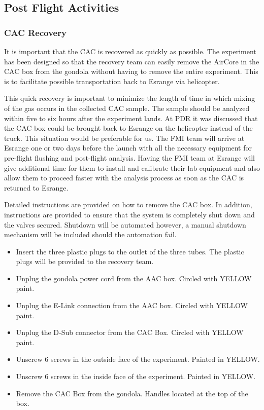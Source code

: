 \subsection{Post Flight Activities}

\subsubsection{CAC Recovery}
It is important that the CAC is recovered as quickly as possible. The experiment has been designed so that the recovery team can easily remove the AirCore in the CAC box from the gondola without having to remove the entire experiment. This is to facilitate possible transportation back to Esrange via helicopter.

This quick recovery is important to minimize the length of time in which mixing of the gas occurs in the collected CAC sample. The sample should be analyzed within five to six hours after the experiment lands. At PDR it was discussed that the CAC box could be brought back to Esrange on the helicopter instead of the truck. This situation would be preferable for us. 
The FMI team will arrive at Esrange one or two days before the launch with all the necessary equipment for pre-flight flushing and post-flight analysis. Having the FMI team at Esrange will give additional time for them to install and calibrate their lab equipment and also allow them to proceed faster with the analysis process as soon as the CAC is returned to Esrange. 

Detailed instructions are provided on how to remove the CAC box. In addition, instructions are provided to ensure that the system is completely shut down and the valves secured. Shutdown will be automated however, a manual shutdown mechanism will be included should the automation fail.

\label{sec:recovery-checklist}

\begin{itemize}
    \item Insert the three plastic plugs to the outlet of the three tubes. The plastic plugs will be provided to the recovery team. 
    \item Unplug the gondola power cord from the AAC box. Circled with YELLOW paint.
    \item Unplug the E-Link connection from the AAC box. Circled with YELLOW paint.
    \item Unplug the D-Sub connector from the CAC Box. Circled with YELLOW paint.
    \item Unscrew 6 screws in the outside face of the experiment. Painted in YELLOW.
    \item Unscrew 6 screws in the inside face of the experiment. Painted in YELLOW.
    \item Remove the CAC Box from the gondola. Handles located at the top of the box. 
\end{itemize}

